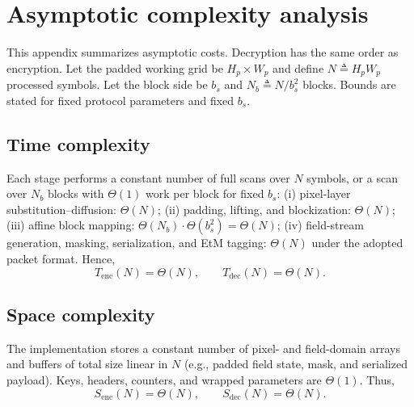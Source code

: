 \appendix
\captionsetup{font=footnotesize}
\setlength{\tabcolsep}{6pt}

\newcommand{\Adv}{\mathsf{Adv}}
\newcommand{\indcpa}{\mathsf{IND\text{-}CPA}}
\newcommand{\prf}{\mathsf{PRF}}
\newcommand{\prg}{\mathsf{PRG}}
\newcommand{\Col}{\mathsf{Col}}

\section{Asymptotic complexity analysis}
\label{app:comp.anly}

This appendix summarizes asymptotic costs. Decryption has the same order as encryption.
Let the padded working grid be $H_p\times W_p$ and define $N\triangleq H_pW_p$ processed symbols.
Let the block side be $b_s$ and $N_b\triangleq N/b_s^2$ blocks. Bounds are stated for fixed protocol
parameters and fixed $b_s$.

\subsection{Time complexity}

Each stage performs a constant number of full scans over $N$ symbols, or a scan over $N_b$ blocks
with $\Theta(1)$ work per block for fixed $b_s$:
(i) pixel-layer substitution--diffusion: $\Theta(N)$;
(ii) padding, lifting, and blockization: $\Theta(N)$;
(iii) affine block mapping: $\Theta(N_b)\cdot\Theta(b_s^2)=\Theta(N)$;
(iv) field-stream generation, masking, serialization, and EtM tagging: $\Theta(N)$ under the adopted packet format.
Hence,
\[
T_{\mathrm{enc}}(N)=\Theta(N),\qquad
T_{\mathrm{dec}}(N)=\Theta(N).
\]

\subsection{Space complexity}

The implementation stores a constant number of pixel- and field-domain arrays and buffers of total
size linear in $N$ (e.g., padded field state, mask, and serialized payload). Keys, headers, counters,
and wrapped parameters are $\Theta(1)$. Thus,
\[
S_{\mathrm{enc}}(N)=\Theta(N),\qquad
S_{\mathrm{dec}}(N)=\Theta(N).
\]

